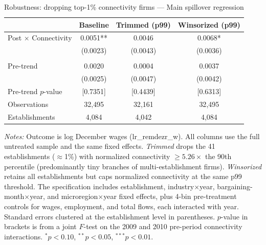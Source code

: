 \documentclass[12pt]{article}
\begin{document}
\begin{table}[H]
\centering
\caption{Robustness: dropping top-1\% connectivity firms --- Main spillover regression}
\label{tab:spill_trim}
\begin{threeparttable}
\begin{tabular}{lccc}
\toprule
 & Baseline & Trimmed (p99) & Winsorized (p99) \\
\midrule
Post $\times$ Connectivity & 0.0051** & 0.0046 & 0.0068* \\
 & (0.0023) & (0.0043) & (0.0036) \\
\\[-4pt]
Pre-trend & 0.0020 & 0.0004 & 0.0037 \\
 & (0.0025) & (0.0047) & (0.0042) \\
\midrule
Pre-trend $p$-value & [0.7351] & [0.4439] & [0.6313] \\
\midrule
Observations & 32{,}495 & 32{,}161 & 32{,}495 \\
Establishments & 4{,}084 & 4{,}042 & 4{,}084 \\
\bottomrule
\end{tabular}
\begin{tablenotes}[flushleft]\footnotesize
\item \textit{Notes:} Outcome is log December wages (lr\_remdezr\_w). All columns use the full untreated sample and the same fixed effects. \textit{Trimmed} drops the 41 establishments ($\approx$1\%) with normalized connectivity $\geq 5.26\times$ the 90th percentile (predominantly tiny branches of multi-establishment firms). \textit{Winsorized} retains all establishments but caps normalized connectivity at the same p99 threshold. The specification includes establishment, industry$\times$year, bargaining-month$\times$year, and microregion$\times$year fixed effects, plus 4-bin pre-treatment controls for wages, employment, and total flows, each interacted with year. Standard errors clustered at the establishment level in parentheses. $p$-value in brackets is from a joint $F$-test on the 2009 and 2010 pre-period connectivity interactions. $^{*}p<0.10$, $^{**}p<0.05$, $^{***}p<0.01$.
\end{tablenotes}
\end{threeparttable}
\end{table}
\end{document}
